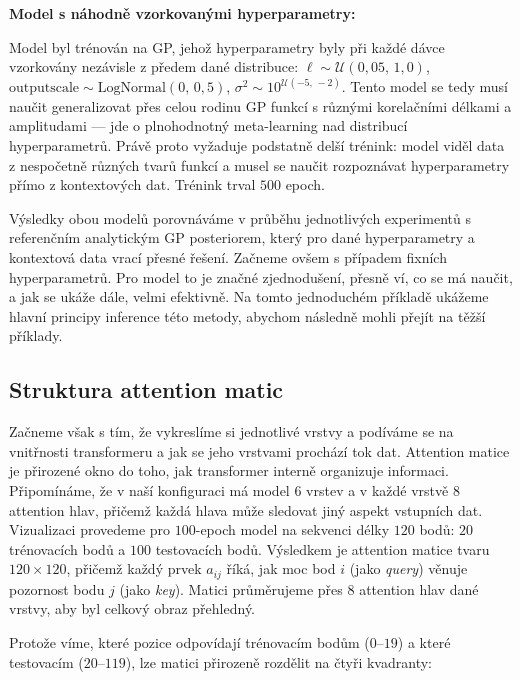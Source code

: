 \textbf{Model s náhodně vzorkovanými hyperparametry:} 

Model byl trénován na GP, jehož hyperparametry byly při každé dávce vzorkovány nezávisle z předem dané distribuce: $\ell \sim \mathcal{U}(0{,}05,\, 1{,}0)$, $\text{outputscale} \sim \text{LogNormal}(0,\, 0{,}5)$, $\sigma^2 \sim 10^{\mathcal{U}(-5,\,-2)}$.
Tento model se tedy musí naučit generalizovat přes celou rodinu GP funkcí s různými korelačními délkami a amplitudami — jde o plnohodnotný meta-learning nad distribucí hyperparametrů.
Právě proto vyžaduje podstatně delší trénink: model viděl data z nespočetně různých tvarů funkcí a musel se naučit rozpoznávat hyperparametry přímo z kontextových dat.
Trénink trval $500$ epoch.
\par

Výsledky obou modelů porovnáváme v průběhu jednotlivých experimentů s referenčním analytickým GP posteriorem, který pro dané hyperparametry a kontextová data vrací přesné řešení.
Začneme ovšem s případem fixních hyperparametrů. 
Pro model to je značné zjednodušení, přesně ví, co se má naučit, a jak se ukáže dále, velmi efektivně.
Na tomto jednoduchém příkladě ukážeme hlavní principy inference této metody, abychom následně mohli přejít na těžší příklady.
\par

\subsection{Struktura attention matic}

Začneme však s tím, že vykreslíme si jednotlivé vrstvy a podíváme se na vnitřnosti transformeru a jak se jeho vrstvami prochází tok dat.
Attention matice je přirozené okno do toho, jak transformer interně organizuje informaci.
Připomínáme, že v naší konfiguraci má model $6$ vrstev a v každé vrstvě $8$ attention hlav, přičemž každá hlava může sledovat jiný aspekt vstupních dat.
Vizualizaci provedeme pro $100$-epoch model na sekvenci délky $120$ bodů: $20$ trénovacích bodů a $100$ testovacích bodů.
Výsledkem je attention matice tvaru $120 \times 120$, přičemž každý prvek $a_{ij}$ říká, jak moc bod $i$ (jako \textit{query}) věnuje pozornost bodu $j$ (jako \textit{key}).
Matici průměrujeme přes $8$ attention hlav dané vrstvy, aby byl celkový obraz přehledný.
\par

Protože víme, které pozice odpovídají trénovacím bodům ($0$–$19$) a které testovacím ($20$–$119$), lze matici přirozeně rozdělit na čtyři kvadranty:

